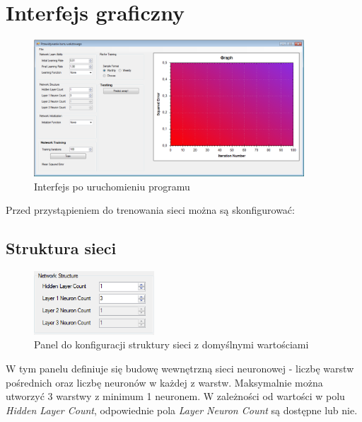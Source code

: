 \documentclass[a4paper]{article}
\begin{document}
		\section{Interfejs graficzny}
			\begin{figure}[h!]
				\centering
				\includegraphics[width=0.90\textwidth]{./img/GUI}
				\caption{Interfejs po uruchomieniu programu}
			\end{figure}
			Przed przystąpieniem do trenowania sieci można są skonfigurować:
			\subsection{Struktura sieci}
				\begin{figure}[h!]
					\centering
					\includegraphics[width=0.40\textwidth]{./img/GUI_network_structure}
					\caption{Panel do konfiguracji struktury sieci z domyślnymi wartościami}
				\end{figure}
				W tym panelu definiuje się budowę wewnętrzną sieci neuronowej - liczbę warstw pośrednich oraz liczbę neuronów w każdej z warstw. Maksymalnie można utworzyć 3 warstwy z minimum 1 neuronem. W zależności od wartości w polu \emph{Hidden Layer Count}, odpowiednie pola \emph{Layer Neuron Count} są dostępne lub nie.
			\newpage
\end{document}
